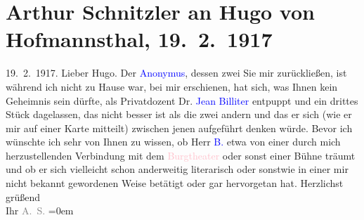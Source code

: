 

               \section[Arthur Schnitzler an Hugo von Hofmannsthal, 19. 2. 1917]{ Arthur Schnitzler an Hugo von Hofmannsthal, 19. 2. 1917}\nopagebreak{}\rehead{ }\normalsize\beginnumbering{} \toendnotes[C]{\smallbreak\pagebreak[2]} \toendnotes[C]{\smallbreak}\pstart
           \noindent{}{\pb}\label{K_L02256_1v}\label{K_L02256_1h}\hfill 19. 2. 1917.\pend
           \pstart{}Lieber Hugo.\pend\pstart
           Der \textcolor{blue}{Anonymus}{}, dessen zwei
                  \label{K_L02256_2v}\label{K_L02256_2h}{ }Sie mir zurückließen, ist \label{K_L02256_3v}\label{K_L02256_3h} während ich nicht zu Hause war, bei mir erschienen, hat sich, was Ihnen kein
               Geheimnis sein dürfte, als Privatdozent Dr. \textcolor{blue}{Jean
                  Billiter}{}\ledrightnote{\textcolor{blue}{Jean Billiter}} entpuppt und ein drittes Stück dagelassen, das nicht besser ist als
               die zwei andern und das er sich (wie er mir auf einer Karte mitteilt) zwischen jenen
               aufgeführt denken würde. Bevor ich \label{K_L02256_4v}\label{K_L02256_4h} wünschte ich sehr von Ihnen zu wissen, ob Herr \textcolor{blue}{B.}{}\ledrightnote{\textcolor{blue}{Jean Billiter}} etwa von einer durch mich herzustellenden Verbindung mit dem \textcolor{pink}{Burgtheater}{}\ledrightnote{\textcolor{pink}{Burgtheater}} oder sonst einer Bühne träumt und ob er
               sich vielleicht schon anderweitig literarisch oder sonstwie in einer mir nicht
               bekannt gewordenen Weise betätigt oder gar hervorgetan hat.\pend
           \pstart
           Herzlichst grüßend{\\[\baselineskip]}Ihr \spacefill\mbox{\textcolor{gray}{A. S.}}\pend
           \leftskip=0em{}\endnumbering{}  
      
